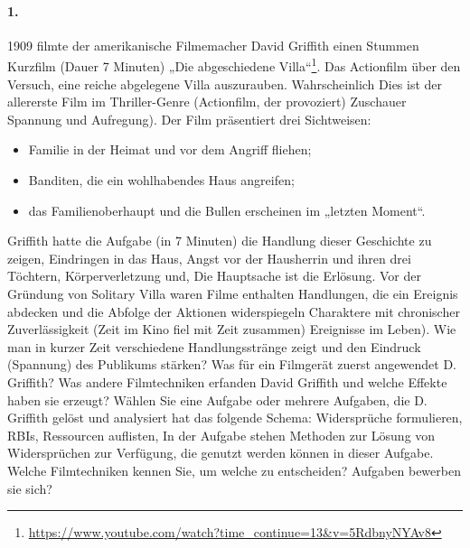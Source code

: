 \documentclass[11pt,a4paper]{article}
\begin{document}
\paragraph{1.}
1909 filmte der amerikanische Filmemacher David Griffith einen Stummen
Kurzfilm (Dauer 7 Minuten) „Die abgeschiedene
Villa“\footnote{\url{https://www.youtube.com/watch?time_continue=13&v=5RdbnyNYAv8}}.
Das Actionfilm über den Versuch, eine reiche abgelegene Villa auszurauben.
Wahrscheinlich Dies ist der allererste Film im Thriller-Genre (Actionfilm, der
provoziert) Zuschauer Spannung und Aufregung). Der Film präsentiert drei
Sichtweisen:
\begin{itemize}
  \item Familie in der Heimat und vor dem Angriff fliehen;
  \item Banditen, die ein wohlhabendes Haus angreifen;
  \item das Familienoberhaupt und die Bullen erscheinen im „letzten Moment“.
\end{itemize}
Griffith hatte die Aufgabe (in 7 Minuten) die Handlung dieser Geschichte zu
zeigen, Eindringen in das Haus, Angst vor der Hausherrin und ihren drei
Töchtern, Körperverletzung und, Die Hauptsache ist die Erlösung. Vor der
Gründung von Solitary Villa waren Filme enthalten Handlungen, die ein Ereignis
abdecken und die Abfolge der Aktionen widerspiegeln Charaktere mit chronischer
Zuverlässigkeit (Zeit im Kino fiel mit Zeit zusammen) Ereignisse im
Leben). Wie man in kurzer Zeit verschiedene Handlungsstränge zeigt und den
Eindruck (Spannung) des Publikums stärken? Was für ein Filmgerät zuerst
angewendet D. Griffith? Was andere Filmtechniken erfanden David Griffith und
welche Effekte haben sie erzeugt? Wählen Sie eine Aufgabe oder mehrere
Aufgaben, die D. Griffith gelöst und analysiert hat das folgende Schema:
Widersprüche formulieren, RBIs, Ressourcen auflisten, In der Aufgabe stehen
Methoden zur Lösung von Widersprüchen zur Verfügung, die genutzt werden können
in dieser Aufgabe. Welche Filmtechniken kennen Sie, um welche zu entscheiden?
Aufgaben bewerben sie sich?
\end{document}
